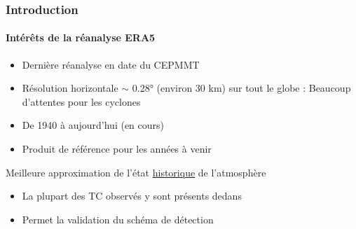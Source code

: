 \documentclass[aspectratio=169, usepdftitle=false, xcolor={dvipsnames}, 9pt,table]{beamer}
\begin{document}

\begin{frame}[t]
    \frametitle{Introduction}
    \framesubtitle{Intérêts de la réanalyse ERA5}
    \small
    \begin{definition}
        \footnotesize
        \begin{itemize}
            \item Dernière réanalyse en date du CEPMMT
            \item Résolution horizontale $\sim$ 0.28° (environ \alert{30 km}) sur tout le globe : Beaucoup d'attentes pour les cyclones
            \item De 1940 à aujourd'hui (en cours)
            \item Produit de référence pour les années à venir
        \end{itemize}
    \end{definition}
    \vspace{1.5em}
    \small
    \begin{block}
        \footnotesize
        Meilleure approximation de l'état \underline{historique} de l'atmosphère
        \tcblower
        \begin{itemize}
            \footnotesize
            \item La plupart des TC observés y sont présents dedans
            \item Permet la validation du schéma de détection
        \end{itemize}
    \end{block}
\end{frame}
 
\end{document}
